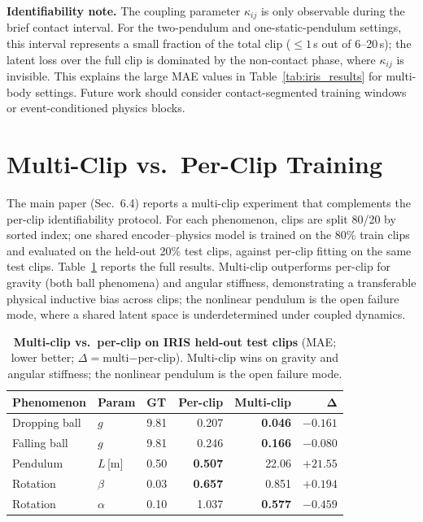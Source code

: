 \documentclass[runningheads]{llncs}
\begin{document}
\textbf{Identifiability note.}  The coupling parameter $\kappa_{ij}$ is
only observable during the brief contact interval.  For the two-pendulum
and one-static-pendulum settings, this interval represents a small fraction
of the total clip ($\leq 1$\,s out of 6--20\,s); the latent loss over the
full clip is dominated by the non-contact phase, where $\kappa_{ij}$ is
invisible.  This explains the large MAE values in Table~\ref{tab:iris_results}
for multi-body settings. Future work should consider contact-segmented
training windows or event-conditioned physics blocks.


\section{Multi-Clip vs.\ Per-Clip Training}
\label{app:multiclip}

The main paper (Sec.~6.4) reports a multi-clip experiment that complements the
per-clip identifiability protocol. For each phenomenon, clips are split 80/20
by sorted index; one shared encoder--physics model is trained on the 80\% train
clips and evaluated on the held-out 20\% test clips, against per-clip fitting on
the same test clips. Table~\ref{tab:multi_clip} reports the full results.
Multi-clip outperforms per-clip for gravity (both ball phenomena) and angular
stiffness, demonstrating a transferable physical inductive bias across clips;
the nonlinear pendulum is the open failure mode, where a shared latent space is
underdetermined under coupled dynamics.

\begin{table}[h]
  \centering
  \caption{\textbf{Multi-clip vs.\ per-clip on IRIS held-out test clips}
  (MAE; lower better; $\Delta{=}$multi$-$per-clip). Multi-clip wins on gravity
  and angular stiffness; the nonlinear pendulum is the open failure mode.}
  \label{tab:multi_clip}
  \footnotesize
  \setlength{\tabcolsep}{4pt}
  \renewcommand{\arraystretch}{1.15}
  \begin{tabular}{@{}lllrrr@{}}
    \toprule
    \textbf{Phenomenon} & \textbf{Param} & \textbf{GT} & \textbf{Per-clip} & \textbf{Multi-clip} & $\bm{\Delta}$ \\
    \midrule
    Dropping ball & $g$ & 9.81 & 0.207 & \cellcolor{bestcolor}\textbf{0.046} & $-0.161$ \\
    Falling ball  & $g$ & 9.81 & 0.246 & \cellcolor{bestcolor}\textbf{0.166} & $-0.080$ \\
    Pendulum      & $L$\,[m] & 0.50 & \cellcolor{bestcolor}\textbf{0.507} & 22.06 & $+21.55$ \\
    Rotation      & $\beta$ & 0.03 & \cellcolor{bestcolor}\textbf{0.657} & 0.851 & $+0.194$ \\
    Rotation      & $\alpha$ & 0.10 & 1.037 & \cellcolor{bestcolor}\textbf{0.577} & $-0.459$ \\
    \bottomrule
  \end{tabular}
\end{table}
\end{document}
